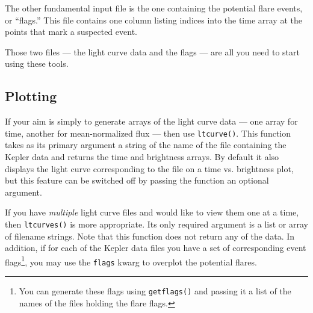 \documentclass[11pt]{article}
\begin{document}
The other fundamental input file is the one containing the potential
flare events, or ``flags.''  This file contains one column listing
indices into the time array at the points that mark a suspected event.


Those two files --- the light curve data and the flags --- are all you
need to start using these tools.


\subsection{Plotting}
\label{sec:basic}
If your aim is simply to generate arrays of the light curve data ---
one array for time, another for mean-normalized flux --- then use
\verb|ltcurve()|.  This function takes as its primary argument a
string of the name of the file containing the Kepler data and returns
the time and brightness arrays.  By default it also displays the light
curve corresponding to the file on a time vs. brightness plot, but
this feature can be switched off by passing the function an optional
argument.

If you have \emph{multiple} light curve files and would like to view
them one at a time, then \verb|ltcurves()| is more appropriate.  Its
only required argument is a list or array of filename strings.  Note
that this function does not return any of the data.  In addition, if
for each of the Kepler data files you have a set of corresponding
event flags\footnote{You can generate these flags using
  \texttt{getflags()} and passing it a list of the names of the files
  holding the flare flags.}, you may use the \verb|flags| kwarg to
overplot the potential flares.
\end{document}
